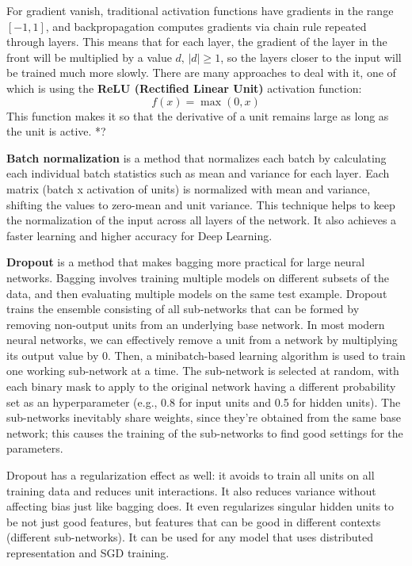 For gradient vanish, traditional activation functions have gradients in the range $[-1,1]$, and backpropagation computes gradients via chain rule repeated through layers. This means that for each layer, the gradient of the layer in the front will be multiplied by a value $d,\,|d| \geq 1$, so the layers closer to the input will be trained much more slowly. There are many approaches to deal with it, one of which is using the \textbf{ReLU (Rectified Linear Unit)} activation function:
\begin{equation*}
    f(x) = \max(0,x)
\end{equation*}
This function makes it so that the derivative of a unit remains large as long as the unit is active. *?

\textbf{Batch normalization} is a method that normalizes each batch by calculating each individual batch statistics such as mean and variance for each layer. Each matrix (batch x activation of units) is normalized with mean and variance, shifting the values to zero-mean and unit variance. This technique helps to keep the normalization of the input across all layers of the network. It also achieves a faster learning and higher accuracy for Deep Learning.

\textbf{Dropout} is a method that makes bagging more practical for large neural networks. Bagging involves training multiple models on different subsets of the data, and then evaluating multiple models on the same test example. Dropout trains the ensemble consisting of all sub-networks that can be formed by removing non-output units from an underlying base network. In most modern neural networks, we can effectively remove a unit from a network by multiplying its output value by 0. Then, a minibatch-based learning algorithm is used to train one working sub-network at a time. The sub-network is selected at random, with each binary mask to apply to the original network having a different probability set as an hyperparameter (e.g., 0.8 for input units and 0.5 for hidden units). The sub-networks inevitably share weights, since they're obtained from the same base network; this causes the training of the sub-networks to find good settings for the parameters.

Dropout has a regularization effect as well: it avoids to train all units on all training data and reduces unit interactions. It also reduces variance without affecting bias just like bagging does. It even regularizes singular hidden units to be not just good features, but features that can be good in different contexts (different sub-networks). It can be used for any model that uses distributed representation and SGD training.